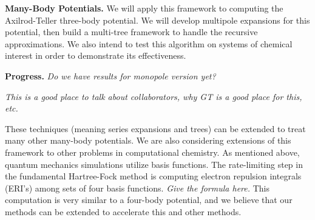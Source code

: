 \documentclass[twoside,leqno, 12pt]{article}
\begin{document}
\textbf{Many-Body Potentials.}  We will apply this framework to computing the Axilrod-Teller three-body potential.  We will develop multipole expansions for this potential, then build a multi-tree framework to handle the recursive approximations.  We also intend to test this algorithm on systems of chemical interest in order to demonstrate its effectiveness.  

\textbf{Progress.}
\textit{Do we have results for monopole version yet?}

\textit{This is a good place to talk about collaborators, why GT is a good place for this, etc.}


These techniques (meaning series expansions and trees) can be extended to treat many other many-body potentials.  We are also considering extensions of this framework to other problems in computational chemistry.  As mentioned above, quantum mechanics simulations utilize basis functions.  The rate-limiting step in the fundamental Hartree-Fock method is computing electron repulsion integrals (ERI's) among sets of four basis functions.  \textit{Give the formula here.}  This computation is very similar to a four-body potential, and we believe that our methods can be extended to accelerate this and other methods.







\end{document}
